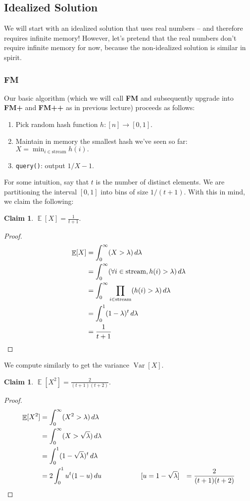 \documentclass[11pt]{article}
\DeclareMathOperator*{\E}{\mathbb{E}}
\let\Pr\relax
\DeclareMathOperator*{\Pr}{\mathbb{P}}
\DeclareMathOperator*{\Var}{\operatorname{Var}}
\newtheorem{claim}[theorem]{Claim}
\begin{document}
\subsection{Idealized Solution}

We will start with an idealized solution that uses real numbers -- and therefore requires infinite memory! However, let's pretend that the real numbers don't require infinite memory for now, because the non-idealized solution is similar in spirit.

\subsubsection{FM} Our basic algorithm (which we will call \textbf{FM} and subsequently upgrade into \textbf{FM+} and \textbf{FM++} as in previous lecture) proceeds as follows:

\begin{enumerate}
\item Pick random hash function $h : [n] \to [0, 1].$
\item Maintain in memory the smallest hash we've seen so far: $X = \min_{i \in \text{stream}} h(i).$
\item \texttt{query()}: output $1/X - 1.$
\end{enumerate}

For some intuition, say that $t$ is the number of distinct elements. We are partitioning the interval $[0, 1]$ into bins of size $1/(t+1).$ With this in mind, we claim the following:

\begin{claim}
$\displaystyle \E[X] = \frac{1}{t+1}.$
\end{claim}
\begin{proof}
\begin{align*}
\E[X] &= \int_0^\infty \Pr(X > \lambda) \, d\lambda \\
&= \int_0^\infty \Pr(\forall i \in \text{stream}, h(i) > \lambda) \, d\lambda \\
&= \int_0^\infty \prod_{i \in \text{stream}} \Pr(h(i) > \lambda) \, d\lambda \\
&= \int_0^1 (1 - \lambda)^t \, d\lambda \\
&= \frac{1}{t+1}
\end{align*}
\end{proof}

We compute similarly to get the variance $\Var[X].$

\begin{claim}
$\displaystyle \E[X^2] = \frac{2}{(t+1)(t+2)}.$
\end{claim}
\begin{proof}
\begin{align*}
\E[X^2] &= \int_0^\infty \Pr(X^2 > \lambda) \, d\lambda \\
&= \int_0^\infty \Pr(X > \sqrt{\lambda}) \, d\lambda \\
&= \int_0^1 (1 - \sqrt{\lambda})^t \, d\lambda \\
&= 2 \int_0^1 u^t (1 - u) \, du \hspace{2cm} [u = 1 - \sqrt{\lambda}]
&= \frac{2}{(t+1)(t+2)}
\end{align*}
\end{proof}
\end{document}
